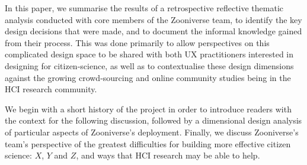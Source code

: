 \documentclass{sigchi}
\begin{document}
% 




In this paper, we summarise the results of a retrospective reflective thematic analysis conducted with core members of the Zooniverse team, to identify the key design decisions that were made, and to document the informal knowledge gained from their process.  This was done primarily to allow perspectives on this complicated design space to be shared with both UX practitioners interested in designing for citizen-science, as well as to contextualise these design dimensions against the growing crowd-sourcing and online community studies being in the HCI research community.  

We begin with a short history of the project in order to introduce readers with the context for the following discussion, followed by a dimensional design analysis of particular aspects of Zooniverse's deployment.  Finally, we discuss Zooniverse's team's perspective of the greatest difficulties for building more effective citizen science: $X$, $Y$ and $Z$, and ways that HCI research may be able to help.

\end{document}
